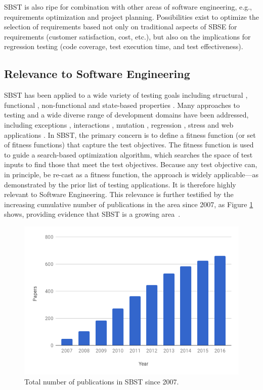 \documentclass[10pt,conference]{IEEEtran}
\newcommand{\subheading}[1]{\vspace{1mm} \noindent {\bf #1}}
\begin{document}
\subheading{Synergies of SBST and other SE areas.} SBST is also ripe
for combination with other areas of software engineering, e.g.,
requirements optimization and project
planning. %
Possibilities exist to optimize the selection of requirements based
not only on traditional aspects of SBSE for requirements (customer
satisfaction, cost, etc.), but also on the implications for regression
testing (code coverage, test execution time, and test effectiveness).

\subsection{Relevance to Software Engineering}
\label{sec:relevance-se}

SBST has been applied to a wide variety of testing goals including
structural \cite{tonella:classes}, functional \cite{wegener:parking},
non-functional \cite{wegener:verifying} and state-based properties
\cite{joshmh:gecco11}.  Many approaches to testing and a wide diverse
range of development domains have been addressed, including exceptions
\cite{tracey-00}, interactions \cite{cohen:constructing},
mutation \cite{zhan:search-based}, regression \cite{syetal:issta09},
stress \cite{briand-stress-small} and web applications
\cite{Thome14:sec}. In SBST, the primary concern is to define a
fitness function (or set of fitness functions) that capture the test
objectives.  The fitness function is used to guide a search-based
optimization algorithm, which searches the space of test inputs to
find those that meet the test objectives.  Because any test objective
can, in principle, be re-cast as a fitness function, the approach is
widely applicable---as demonstrated by the prior list of testing
applications.  It is therefore highly relevant to Software
Engineering.  This relevance is further testified by the increasing
cumulative number of publications in the area since 2007, as Figure
\ref{fig:pubs} shows, providing evidence that SBST is a growing
area~\cite{yzmham:sbse-repository}.

\begin{figure}
\centering
\includegraphics[width=.7\columnwidth]{chart.png}
\caption{\label{fig:pubs}Total number of publications in SBST since
  2007.}
\end{figure}
\end{document}
